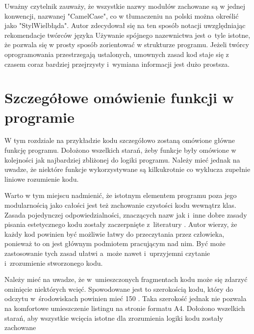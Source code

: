 \documentclass[eng,printmode]{mgr}
\begin{document}
Uważny czytelnik zauważy, że wszystkie nazwy modułów zachowane są w jednej konwencji, nazwanej "CamelCase", co w tłumaczeniu na polski można określić jako "StylWielbłąda". Autor zdecydował się na ten sposób notacji uwzględniając rekomendacje twórców języka \cite{PEP8}Używanie spójnego nazewnictwa jest o~tyle istotne, że pozwala się w prosty sposób zorientować w strukturze programu. Jeżeli twórcy oprogramowania przestrzegają ustalonych, umownych zasad kod staje się z czasem coraz bardziej przejrzysty i~wymiana informacji jest dużo prostsza. 

\chapter{Szczegółowe omówienie funkcji w programie} \label{szczegolowe_omowienie}
W tym rozdziale na przykładzie kodu szczegółowo zostaną omówione główne funkcję programu. Dołożono wszelkich starań, żeby funkcje były omówione w kolejności jak najbardziej zbliżonej do logiki programu. Należy mieć jednak na uwadze, że niektóre funkcje wykorzystywane są kilkukrotnie co wyklucza zupełnie liniowe rozumienie kodu.

Warto w tym miejscu nadmienić, że istotnym elementem programu poza jego modularnością jako całości jest też zachowanie czystości kodu wewnątrz klas. Zasada pojedynczej odpowiedzialności, znaczących nazw jak i~inne dobre zasady pisania estetycznego kodu zostały zaczerpnięte z~literatury \cite{Czysty_kod}. Autor wierzy, że każdy kod powinien być możliwie łatwy do przeczytania przez człowieka, ponieważ to on jest głównym podmiotem pracującym nad nim. Być może zastosowanie tych zasad ułatwi a~może nawet i~uprzyjemni czytanie i~zrozumienie stworzonego kodu. 

Należy mieć na uwadze, że w~umieszczonych fragmentach kodu może się zdarzyć ominięcie niektórych wcięć. Spowodowane jest to szerokością kodu, który do odczytu w~środowiskach powinien mieć 150 \cite{PEP8}. Taka szerokość jednak nie pozwala na komfortowe umieszczenie listingu na stronie formatu A4. Dołożono wszelkich starań, aby wszystkie wcięcia istotne dla zrozumienia logiki kodu zostały zachowane
\newpage
\end{document}
